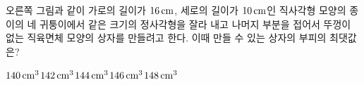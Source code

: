 \noindent\begin{minipage}[t]{0.58\linewidth}\vspace{0pt}\raggedright 오른쪽 그림과 같이 가로의 길이가 $16\mkern3mu \mathrm{cm}$, 세로의 길이가 $10\mkern3mu \mathrm{cm}$인 직사각형 모양의 종이의 네 귀퉁이에서 같은 크기의 정사각형을 잘라 내고 나머지 부분을 접어서 뚜껑이 없는 직육면체 모양의 상자를 만들려고 한다. 이때 만들 수 있는 상자의 부피의 최댓값은?\end{minipage}\hfill\begin{minipage}[t]{0.4\linewidth}\vspace{0pt}\centering \resizebox{\ifdim\width>\linewidth\linewidth\else\width\fi}{!}{}\end{minipage}\par
\begin{choices32}{$140\mkern3mu \mathrm{cm}^3$}{$142\mkern3mu \mathrm{cm}^3$}{$144\mkern3mu \mathrm{cm}^3$}{$146\mkern3mu \mathrm{cm}^3$}{$148\mkern3mu \mathrm{cm}^3$}\end{choices32}
